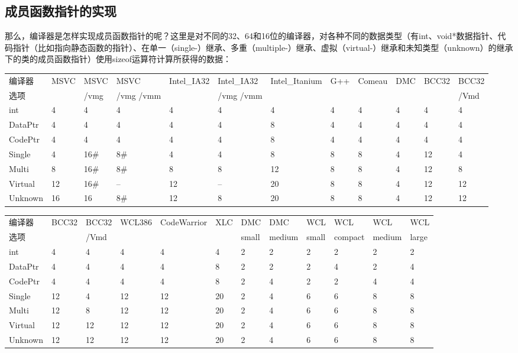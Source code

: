 \documentclass{article}
\begin{document}
\begin{CJK}{UTF8}{gbsn}
\subsection{成员函数指针的实现}
那么，编译器是怎样实现成员函数指针的呢？这里是对不同的32、64和16位的编译器，对各种不同的数据类型（有int、void*数据指针、代码指针（比如指向静态函数的指针）、在单一（single-）继承、多重（multiple-）继承、虚拟（virtual-）继承和未知类型（unknown）的继承下的类的成员函数指针）使用sizeof运算符计算所获得的数据：

\begin{tabular}{|l|l|l|l|l|l|l|l|l|l|l|l|}
  \hline
  \hline
编译器 & MSVC & MSVC & MSVC & Intel\_IA32 & Intel\_IA32 & Intel\_Itanium & G++ & Comeau & DMC & BCC32 & BCC32  \\
选项 &  & /vmg & /vmg /vmm &  & /vmg /vmm &  &  &  &  &  & /Vmd \\
int & 4 & 4 & 4 & 4 & 4 & 4 & 4 & 4 & 4 & 4 & 4 \\
DataPtr & 4 & 4 & 4 & 4 & 4 & 8 & 4 & 4 & 4 & 4 & 4  \\
CodePtr & 4 & 4 & 4 & 4 & 4 & 8 & 4 & 4 & 4 & 4 & 4  \\
Single & 4 & 16\# & 8\# & 4 & 4 & 8 & 8 & 8 & 4 & 12 & 4  \\
Multi & 8 & 16\# & 8\# & 8 & 8 & 12 & 8 & 8 & 4 & 12 & 8  \\
Virtual & 12 & 16\# & -- & 12 & -- & 20 & 8 & 8 & 4 & 12 & 12  \\
Unknown & 16 & 16 & 8\# & 12 & 8 & 20 & 8 & 8 & 4 & 12 & 12  \\
  \hline
  \hline
\end{tabular}

\begin{tabular}{|l|l|l|l|l|l|l|l|l|l|l|l|}
  \hline
  \hline
编译器 & BCC32 & BCC32 & WCL386 & CodeWarrior & XLC & DMC & DMC & WCL & WCL & WCL & WCL  \\
选项 &  & /Vmd &  &  &  & small & medium & small & compact & medium & large  \\
int & 4 & 4 & 4 & 4 & 4 & 2 & 2 & 2 & 2 & 2 & 2  \\
DataPtr & 4 & 4 & 4 & 4 & 8 & 2 & 2 & 2 & 4 & 2 & 4  \\
CodePtr & 4 & 4 & 4 & 4 & 8 & 2 & 4 & 2 & 2 & 4 & 4  \\
Single & 12 & 4 & 12 & 12 & 20 & 2 & 4 & 6 & 6 & 8 & 8  \\
Multi & 12 & 8 & 12 & 12 & 20 & 2 & 4 & 6 & 6 & 8 & 8  \\
Virtual & 12 & 12 & 12 & 12 & 20 & 2 & 4 & 6 & 6 & 8 & 8  \\
Unknown & 12 & 12 & 12 & 12 & 20 & 2 & 4 & 6 & 6 & 8 & 8  \\
  \hline
  \hline
\end{tabular}


\end{CJK}
\end{document}
